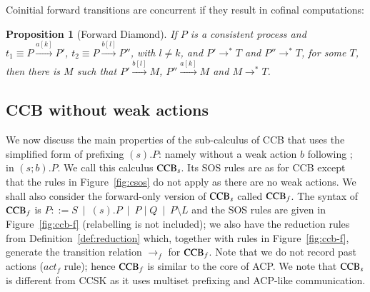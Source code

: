 \documentclass[preprint,12pt]{elsarticle}
\newcommand{\paral}{\; \vert \;}
\newcommand{\restrict}[1]{\!\setminus\!#1}
\newtheorem{proposition}{Proposition}
\begin{document}
Coinitial forward transitions are concurrent if they result in cofinal computations:

\begin{proposition}[Forward Diamond]\label{prop:fowarddiamond}If $P$ is a consistent process and 
$t_1 \equiv P \xrightarrow{a[k]} P'$, $t_2 \equiv P \xrightarrow{b[l]} P''$,  with $l \neq k $,
and $P' \rightarrow^*T$ and $P'' \rightarrow^* T$, for some $T$, then there is $M$ such
that $P' \xrightarrow{b[l]} M$, $P'' \xrightarrow{a[k]} M$ and $M \rightarrow^* T$.
\end{proposition}

\subsection{CCB without weak actions}
We now discuss the main properties of the sub-calculus of CCB that uses the
simplified form of prefixing $(s).P$: namely without a weak action $b$ following $;$ in $(s;b).P$. 
We call this calculus $\mbox{\rm CCB}_s$.
Its SOS rules are as for CCB except that the rules in
Figure~\ref{fig:csos} do not apply as there are no weak actions.
We shall also consider the forward-only version of $\mbox{\rm CCB}_s$
called $\mbox{\rm CCB}_f$. The syntax of $\mbox{\rm CCB}_f$
is $P ::=  S \ \mid \ (s).P \ \mid \ P\paral Q \ \mid \ P\restrict L$
and the SOS rules
are given in Figure~\ref{fig:ccb-f} (relabelling is not included);
we also have the reduction rules from Definition~\ref{def:reduction} which, together with rules
in Figure~\ref{fig:ccb-f}, generate the transition
relation $\xrightarrow{}_f$ for $\mbox{\rm CCB}_f$.
Note that we do not record past actions (\mbox{$act_f$} rule);
hence $\mbox{\rm CCB}_f$ is similar to the core of ACP. We note that $\mbox{\rm CCB}_s$ is different
from CCSK \cite{PU06,PhiUli07} as it uses multiset prefixing and ACP-like communication.
\end{document}
